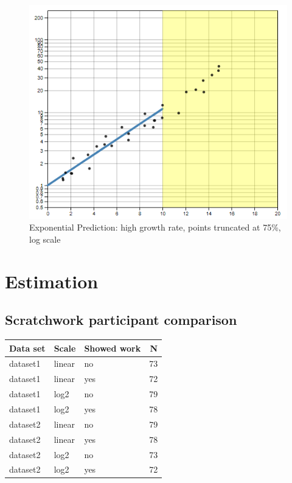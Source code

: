 \documentclass[print]{nuthesis}
\begin{document}
\begin{figure}[tbp]

{\centering \includegraphics[width=0.65\linewidth,]{images/high-15-log} 

}

\caption{Exponential Prediction: high growth rate, points truncated at 75\%, log scale}\label{fig:high-15-log}
\end{figure}

\hypertarget{estimation-1}{%
\chapter{Estimation}\label{estimation-1}}

\hypertarget{estimation-comparison}{%
\section{Scratchwork participant comparison}\label{estimation-comparison}}

\begin{tabular}{l|l|l|r}
\hline
Data set & Scale & Showed work & N\\
\hline
dataset1 & linear & no & 73\\
\hline
dataset1 & linear & yes & 72\\
\hline
dataset1 & log2 & no & 79\\
\hline
dataset1 & log2 & yes & 78\\
\hline
dataset2 & linear & no & 79\\
\hline
dataset2 & linear & yes & 78\\
\hline
dataset2 & log2 & no & 73\\
\hline
dataset2 & log2 & yes & 72\\
\hline
\end{tabular}
\end{document}
